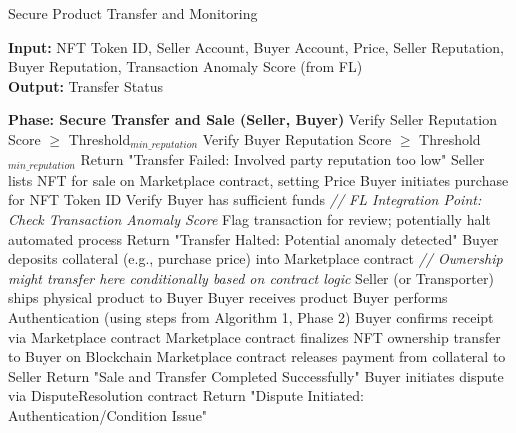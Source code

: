 \documentclass[conference]{IEEEtran}
\begin{document}
\begin{algorithm}[H]
\caption{Secure Product Transfer and Monitoring}
\textbf{Input:} NFT Token ID, Seller Account, Buyer Account, Price, Seller Reputation, Buyer Reputation, Transaction Anomaly Score (from FL) \\
\textbf{Output:} Transfer Status
\begin{algorithmic}[1]

\STATE \textbf{Phase: Secure Transfer and Sale (Seller, Buyer)}
\STATE Verify Seller Reputation Score $\geq$ Threshold$_{min\_reputation}$
\STATE Verify Buyer Reputation Score $\geq$ Threshold$_{min\_reputation}$
    \STATE Return "Transfer Failed: Involved party reputation too low"
\ENDIF
\STATE Seller lists NFT for sale on Marketplace contract, setting Price
\STATE Buyer initiates purchase for NFT Token ID
\STATE Verify Buyer has sufficient funds
\STATE \textit{// FL Integration Point: Check Transaction Anomaly Score}
    \STATE Flag transaction for review; potentially halt automated process
    \STATE Return "Transfer Halted: Potential anomaly detected"
\ENDIF
\STATE Buyer deposits collateral (e.g., purchase price) into Marketplace contract
\STATE \textit{// Ownership might transfer here conditionally based on contract logic}
\STATE Seller (or Transporter) ships physical product to Buyer
\STATE Buyer receives product
\STATE Buyer performs Authentication (using steps from Algorithm 1, Phase 2)
    \STATE Buyer confirms receipt via Marketplace contract
    \STATE Marketplace contract finalizes NFT ownership transfer to Buyer on Blockchain
    \STATE Marketplace contract releases payment from collateral to Seller
    \STATE Return "Sale and Transfer Completed Successfully"
\ELSE
    \STATE Buyer initiates dispute via DisputeResolution contract
    \STATE Return "Dispute Initiated: Authentication/Condition Issue"
\ENDIF
\end{algorithmic}
\end{algorithm}
\end{document}

